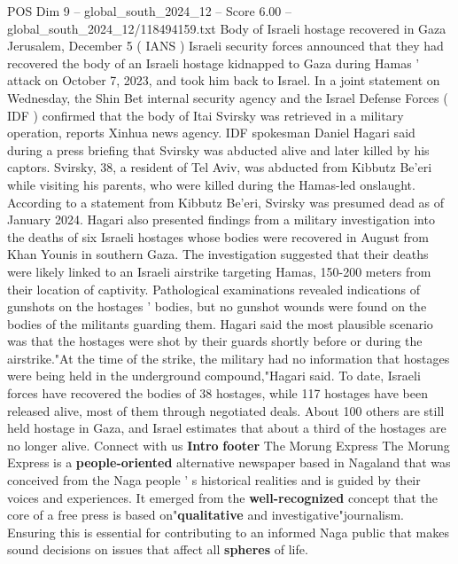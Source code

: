 \begin{textsample}{POS Dim 9 – global\_south\_2024\_12 – Score 6.00 – global\_south\_2024\_12/118494159.txt}  \label{ex:f9_pos_323}
Body of Israeli hostage recovered in Gaza Jerusalem, December 5 ( IANS ) Israeli security forces announced that they had recovered the body of an Israeli hostage kidnapped to Gaza during Hamas ' attack on October 7, 2023, and took him back to Israel.
In a joint statement on Wednesday, the Shin Bet internal security agency and the Israel Defense Forces ( IDF ) confirmed that the body of Itai Svirsky was retrieved in a military operation, reports Xinhua news agency.
IDF spokesman Daniel Hagari said during a press briefing that Svirsky was abducted alive and later killed by his captors.
Svirsky, 38, a resident of Tel Aviv, was abducted from Kibbutz Be'eri while visiting his parents, who were killed during the Hamas-led onslaught.
According to a statement from Kibbutz Be'eri, Svirsky was presumed dead as of January 2024.
Hagari also presented findings from a military investigation into the deaths of six Israeli hostages whose bodies were recovered in August from Khan Younis in southern Gaza.
The investigation suggested that their deaths were likely linked to an Israeli airstrike targeting Hamas, 150-200 meters from their location of captivity.
Pathological examinations revealed indications of gunshots on the hostages ' bodies, but no gunshot wounds were found on the bodies of the militants guarding them.
Hagari said the most plausible scenario was that the hostages were shot by their guards shortly before or during the airstrike."At the time of the strike, the military had no information that hostages were being held in the underground compound,"Hagari said.
To date, Israeli forces have recovered the bodies of 38 hostages, while 117 hostages have been released alive, most of them through negotiated deals.
About 100 others are still held hostage in Gaza, and Israel estimates that about a third of the hostages are no longer alive.
Connect with us \textbf{Intro} \textbf{footer} The Morung Express The Morung Express is a \textbf{people-oriented} alternative newspaper based in Nagaland that was conceived from the Naga people ' s historical realities and is guided by their voices and experiences.
It emerged from the \textbf{well-recognized} concept that the core of a free press is based on"\textbf{qualitative} and investigative"journalism.
Ensuring this is essential for contributing to an informed Naga public that makes sound decisions on issues that affect all \textbf{spheres} of life.

\end{textsample}
